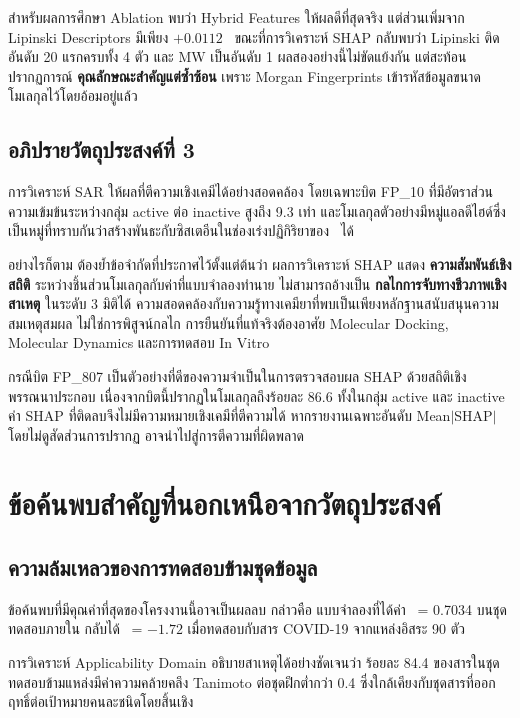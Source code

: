สำหรับผลการศึกษา Ablation พบว่า Hybrid Features ให้ผลดีที่สุดจริง แต่ส่วนเพิ่มจาก Lipinski Descriptors มีเพียง $+0.0112$ \Rsq\ ขณะที่การวิเคราะห์ SHAP กลับพบว่า Lipinski ติดอันดับ 20 แรกครบทั้ง 4 ตัว และ MW เป็นอันดับ 1 ผลสองอย่างนี้ไม่ขัดแย้งกัน แต่สะท้อนปรากฏการณ์ \textbf{คุณลักษณะสำคัญแต่ซ้ำซ้อน} เพราะ Morgan Fingerprints เข้ารหัสข้อมูลขนาดโมเลกุลไว้โดยอ้อมอยู่แล้ว

\subsection{อภิปรายวัตถุประสงค์ที่ 3}

การวิเคราะห์ SAR ให้ผลที่ตีความเชิงเคมีได้อย่างสอดคล้อง โดยเฉพาะบิต FP\_10 ที่มีอัตราส่วนความเข้มข้นระหว่างกลุ่ม active ต่อ inactive สูงถึง 9.3 เท่า และโมเลกุลตัวอย่างมีหมู่แอลดีไฮด์ซึ่งเป็นหมู่ที่ทราบกันว่าสร้างพันธะกับซิสเตอีนในช่องเร่งปฏิกิริยาของ \Mpro\ ได้

อย่างไรก็ตาม ต้องย้ำข้อจำกัดที่ประกาศไว้ตั้งแต่ต้นว่า ผลการวิเคราะห์ SHAP แสดง \textbf{ความสัมพันธ์เชิงสถิติ} ระหว่างชิ้นส่วนโมเลกุลกับค่าที่แบบจำลองทำนาย ไม่สามารถอ้างเป็น \textbf{กลไกการจับทางชีวภาพเชิงสาเหตุ} ในระดับ 3 มิติได้ ความสอดคล้องกับความรู้ทางเคมียาที่พบเป็นเพียงหลักฐานสนับสนุนความสมเหตุสมผล ไม่ใช่การพิสูจน์กลไก การยืนยันที่แท้จริงต้องอาศัย Molecular Docking, Molecular Dynamics และการทดสอบ In Vitro

กรณีบิต FP\_807 เป็นตัวอย่างที่ดีของความจำเป็นในการตรวจสอบผล SHAP ด้วยสถิติเชิงพรรณนาประกอบ เนื่องจากบิตนี้ปรากฏในโมเลกุลถึงร้อยละ 86.6 ทั้งในกลุ่ม active และ inactive ค่า SHAP ที่ติดลบจึงไม่มีความหมายเชิงเคมีที่ตีความได้ หากรายงานเฉพาะอันดับ Mean$|$SHAP$|$ โดยไม่ดูสัดส่วนการปรากฏ อาจนำไปสู่การตีความที่ผิดพลาด

\section{ข้อค้นพบสำคัญที่นอกเหนือจากวัตถุประสงค์}

\subsection{ความล้มเหลวของการทดสอบข้ามชุดข้อมูล}

ข้อค้นพบที่มีคุณค่าที่สุดของโครงงานนี้อาจเป็นผลลบ กล่าวคือ แบบจำลองที่ได้ค่า \Rsq\ = 0.7034 บนชุดทดสอบภายใน กลับได้ \Rsq\ = $-1.72$ เมื่อทดสอบกับสาร COVID-19 จากแหล่งอิสระ 90 ตัว

การวิเคราะห์ Applicability Domain อธิบายสาเหตุได้อย่างชัดเจนว่า ร้อยละ 84.4 ของสารในชุดทดสอบข้ามแหล่งมีค่าความคล้ายคลึง Tanimoto ต่อชุดฝึกต่ำกว่า 0.4 ซึ่งใกล้เคียงกับชุดสารที่ออกฤทธิ์ต่อเป้าหมายคนละชนิดโดยสิ้นเชิง

